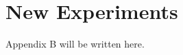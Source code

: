 \appendix
\renewcommand{\thechapter}{B}
\renewcommand{\chaptername}{Appendix}

\chapter{New Experiments}

Appendix B will be written here.
